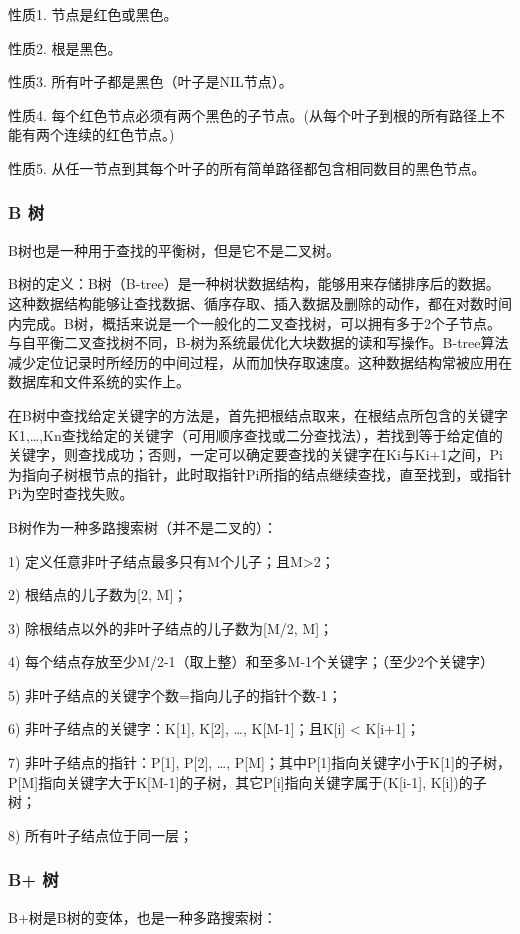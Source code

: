 \documentclass[UTF8,a4paper,12pt]{ctexbook}
\begin{document}
				性质1. 节点是红色或黑色。
				
				性质2. 根是黑色。
				
				性质3. 所有叶子都是黑色（叶子是NIL节点）。
				
				性质4. 每个红色节点必须有两个黑色的子节点。(从每个叶子到根的所有路径上不能有两个连续的红色节点。)
				
				性质5. 从任一节点到其每个叶子的所有简单路径都包含相同数目的黑色节点。
		\subsubsection{B 树}
			B树也是一种用于查找的平衡树，但是它不是二叉树。
			
			B树的定义：B树（B-tree）是一种树状数据结构，能够用来存储排序后的数据。这种数据结构能够让查找数据、循序存取、插入数据及删除的动作，都在对数时间内完成。B树，概括来说是一个一般化的二叉查找树，可以拥有多于2个子节点。与自平衡二叉查找树不同，B-树为系统最优化大块数据的读和写操作。B-tree算法减少定位记录时所经历的中间过程，从而加快存取速度。这种数据结构常被应用在数据库和文件系统的实作上。
			
			在B树中查找给定关键字的方法是，首先把根结点取来，在根结点所包含的关键字K1,…,Kn查找给定的关键字（可用顺序查找或二分查找法），若找到等于给定值的关键字，则查找成功；否则，一定可以确定要查找的关键字在Ki与Ki+1之间，Pi为指向子树根节点的指针，此时取指针Pi所指的结点继续查找，直至找到，或指针Pi为空时查找失败。
			
			B树作为一种多路搜索树（并不是二叉的）：
			
			1) 定义任意非叶子结点最多只有M个儿子；且M>2；
			
			2) 根结点的儿子数为[2, M]；
			
			3) 除根结点以外的非叶子结点的儿子数为[M/2, M]；
			
			4) 每个结点存放至少M/2-1（取上整）和至多M-1个关键字；（至少2个关键字）
			
			5) 非叶子结点的关键字个数=指向儿子的指针个数-1；
			
			6) 非叶子结点的关键字：K[1], K[2], …, K[M-1]；且K[i] < K[i+1]；
			
			7) 非叶子结点的指针：P[1], P[2], …, P[M]；其中P[1]指向关键字小于K[1]的子树，P[M]指向关键字大于K[M-1]的子树，其它P[i]指向关键字属于(K[i-1], K[i])的子树；
			
			8) 所有叶子结点位于同一层；
		
		\subsubsection{B+ 树}
			B+树是B树的变体，也是一种多路搜索树：
			
\end{document}
